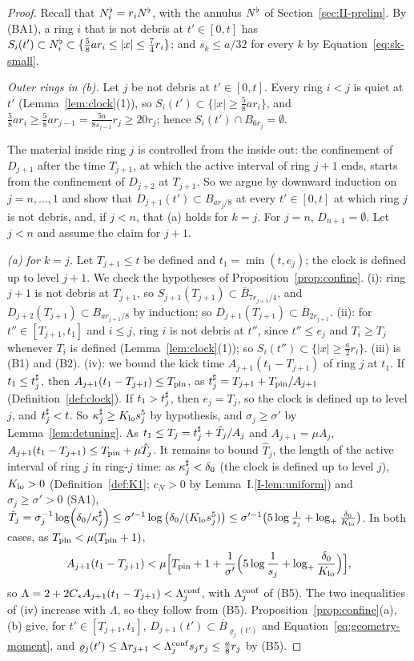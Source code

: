 \begin{proof}
Recall that $N^{\flat}_i=r_iN^{\flat}$, with the annulus $N^{\flat}$ of
Section~\ref{sec:II-prelim}. By (BA1), a ring $i$ that is not debris at $t'\in[0,t]$ has
$S_i(t')\subset N^{\flat}_i\subset\{\frac58ar_i\le|x|\le\frac74r_i\}$; and
$s_k\le a/32$ for every $k$ by Equation~\eqref{eq:sk-small}.

\emph{Outer rings in \textup{(b)}.} Let $j$ be not debris at $t'\in[0,t]$. Every
ring $i<j$ is quiet at $t'$ (Lemma~\ref{lem:clock}(1)), so
$S_i(t')\subset\{|x|\ge\frac58ar_i\}$, and
$\frac58ar_i\ge\frac58ar_{j-1}=\frac{5a}{8s_{j-1}}r_j\ge20r_j$; hence
$S_i(t')\cap B_{6r_j}=\emptyset$.

The material inside ring $j$ is controlled from the inside out: the confinement
of $D_{j+1}$ after the time $T_{j+1}$, at which the active interval of ring $j+1$
ends, starts from the confinement of $D_{j+2}$ at $T_{j+1}$. So we argue by
downward induction on $j=n,\dots,1$ and show that $D_{j+1}(t')\subset
B_{ar_j/8}$ at every $t'\in[0,t]$ at which ring $j$ is not debris, and, if
$j<n$, that (a) holds for $k=j$. For $j=n$, $D_{n+1}=\emptyset$. Let $j<n$ and
assume the claim for $j+1$.

\emph{\textup{(a)} for $k=j$.} Let $T_{j+1}\le t$ be defined and
$t_1=\min(t,e_j)$; the clock is defined up to level $j+1$. We check the
hypotheses of Proposition~\ref{prop:confine}.
(i): ring $j+1$ is not debris at $T_{j+1}$, so
$S_{j+1}(T_{j+1})\subset\overline B_{7r_{j+1}/4}$, and
$D_{j+2}(T_{j+1})\subset B_{ar_{j+1}/8}$ by induction; so
$D_{j+1}(T_{j+1})\subset\overline B_{2r_{j+1}}$. (ii): for
$t''\in[T_{j+1},t_1]$ and $i\le j$, ring $i$ is not debris at $t''$, since
$t''\le e_j$ and $T_i\ge T_j$ whenever $T_i$ is defined
(Lemma~\ref{lem:clock}(1)); so $S_i(t'')\subset\{|x|\ge\frac a2r_i\}$. (iii) is
(B1) and (B2). (iv): we bound the kick time $A_{j+1}(t_1-T_{j+1})$ of ring $j$
at $t_1$. If $t_1\le t^\sharp_j$, then $A_{j+1}(t_1-T_{j+1})\le T_{\mathrm{pin}}$, as
$t^\sharp_j=T_{j+1}+T_{\mathrm{pin}}/A_{j+1}$ (Definition~\ref{def:clock}). If $t_1>t^\sharp_j$,
then $e_j=T_j$, so the clock is defined up to level $j$, and $t^\sharp_j<t$. So
$\kappa^\sharp_j\ge K_{\mathrm{lo}} s_j^5$ by hypothesis, and $\sigma_j\ge\sigma'$ by
Lemma~\ref{lem:detuning}. As $t_1\le T_j=t^\sharp_j+\hat T_j/A_j$ and
$A_{j+1}=\mu A_j$, $A_{j+1}(t_1-T_{j+1})\le T_{\mathrm{pin}}+\mu\hat T_j$. It remains to
bound $\hat T_j$, the length of the active interval of ring $j$ in ring-$j$ time: as
$\kappa^\sharp_j<\delta_0$ (the clock is defined up to level $j$), $K_{\mathrm{lo}}>0$ (Definition~\ref{def:K1}; $c_N>0$ by Lemma~I.\ref{I-lem:uniform}) and
$\sigma_j\ge\sigma'>0$ (SA1),
$\hat T_j=\sigma_j^{-1}\log(\delta_0/\kappa^\sharp_j)\le\sigma'^{-1}\log\big(\delta_0/(K_{\mathrm{lo}} s_j^5)\big)\le\sigma'^{-1}\big(5\log\frac1{s_j}+\log_+\frac{\delta_0}{K_{\mathrm{lo}}}\big)$.
In both cases, as $T_{\mathrm{pin}}<\mu(T_{\mathrm{pin}}+1)$,
\[
A_{j+1}(t_1-T_{j+1})<\mu\Big[T_{\mathrm{pin}}+1+\frac1{\sigma'}\Big(5\log\frac1{s_j}+\log_+\frac{\delta_0}{K_{\mathrm{lo}}}\Big)\Big],
\]
so $\Lambda=2+2C_{*} A_{j+1}(t_1-T_{j+1})<\Lambda^{\mathrm{conf}}_j$, with $\Lambda^{\mathrm{conf}}_j$ of (B5).
The two inequalities of (iv) increase with $\Lambda$, so they follow from (B5).
Proposition~\ref{prop:confine}(a), (b) give, for $t'\in[T_{j+1},t_1]$,
$D_{j+1}(t')\subset\overline B_{\varrho_j(t')}$ and Equation~\eqref{eq:geometry-moment},
and $\varrho_j(t')\le\Lambda r_{j+1}<\Lambda^{\mathrm{conf}}_js_jr_j\le\frac a8r_j$ by (B5).


\end{proof}
